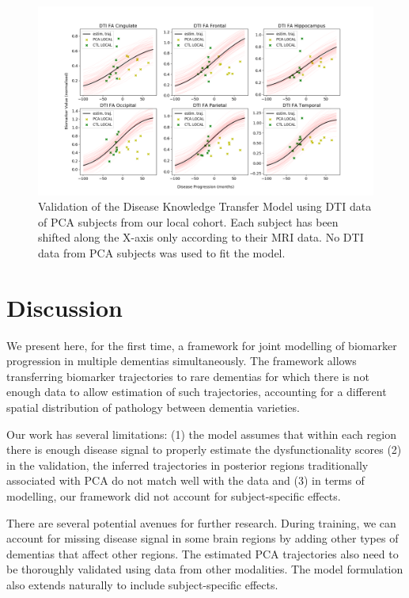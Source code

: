 \documentclass{llncs}
\begin{document}
\begin{figure}
 \includegraphics[width=\textwidth, trim=0 0 0 0, clip]{figures/validDtiPCA.png}
 \caption{Validation of the Disease Knowledge Transfer Model using DTI data of PCA subjects from our local cohort. Each subject has been shifted along the X-axis only according to their MRI data. No DTI data from PCA subjects was used to fit the model.}
\label{fig:DTIvalid}
\end{figure}

\section{Discussion}

We present here, for the first time, a framework for joint modelling of biomarker progression in multiple dementias simultaneously. The framework allows transferring biomarker trajectories to rare dementias for which there is not enough data to allow estimation of such trajectories, accounting for a different spatial distribution of pathology between dementia varieties. 

Our work has several limitations: (1) the model assumes that within each region there is enough disease signal to properly estimate the dysfunctionality scores (2) in the validation, the inferred trajectories in posterior regions traditionally associated with PCA do not match well with the data and (3) in terms of modelling, our framework did not account for subject-specific effects.

There are several potential avenues for further research. During training, we can account for missing disease signal in some brain regions by adding other types of dementias that affect other regions. The estimated PCA trajectories also need to be thoroughly validated using data from other modalities. The model formulation also extends naturally to include subject-specific effects.
\end{document}
